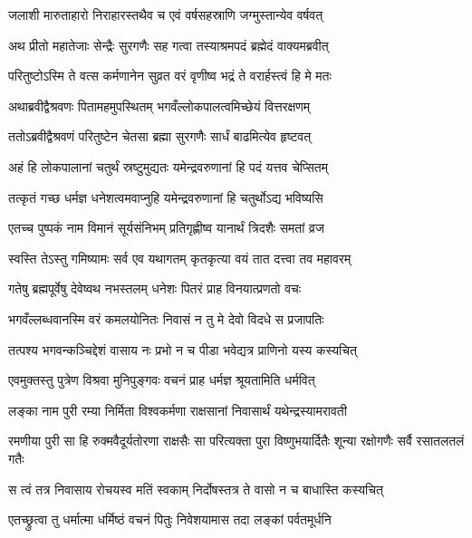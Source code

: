 \twolineshloka
{जलाशी मारुताहारो निराहारस्तथैव च}
{एवं वर्षसहस्राणि जग्मुस्तान्येव वर्षवत्} %

\twolineshloka
{अथ प्रीतो महातेजाः सेन्द्रैः सुरगणैः सह}
{गत्वा तस्याश्रमपदं ब्रह्मेदं वाक्यमब्रवीत्} %

\twolineshloka
{परितुष्टोऽस्मि ते वत्स कर्मणानेन सुव्रत}
{वरं वृणीष्व भद्रं ते वरार्हस्त्वं हि मे मतः} %

\twolineshloka
{अथाब्रवीद्वैश्रवणः पितामहमुपस्थितम्}
{भगवँल्लोकपालत्वमिच्छेयं वित्तरक्षणम्} %

\twolineshloka
{ततोऽब्रवीद्वैश्रवणं परितुष्टेन चेतसा}
{ब्रह्मा सुरगणैः सार्धं बाढमित्येव हृष्टवत्} %

\twolineshloka
{अहं हि लोकपालानां चतुर्थं स्रष्टुमुद्यतः}
{यमेन्द्रवरुणानां हि पदं यत्तव चेप्सितम्} %

\twolineshloka
{तत्कृतं गच्छ धर्मज्ञ धनेशत्वमवाप्नुहि}
{यमेन्द्रवरुणानां हि चतुर्थोऽद्य भविष्यसि} %

\twolineshloka
{एतच्च पुष्पकं नाम विमानं सूर्यसंनिभम्}
{प्रतिगृह्णीष्व यानार्थं त्रिदशैः समतां व्रज} %

\twolineshloka
{स्वस्ति तेऽस्तु गमिष्यामः सर्व एव यथागतम्}
{कृतकृत्या वयं तात दत्त्वा तव महावरम्} %

\twolineshloka
{गतेषु ब्रह्मपूर्वेषु देवेष्वथ नभस्तलम्}
{धनेशः पितरं प्राह विनयात्प्रणतो वचः} %

\twolineshloka
{भगवँल्लब्धवानस्मि वरं कमलयोनितः}
{निवासं न तु मे देवो विदधे स प्रजापतिः} %

\twolineshloka
{तत्पश्य भगवन्कञ्चिद्देशं वासाय नः प्रभो}
{न च पीडा भवेद्यत्र प्राणिनो यस्य कस्यचित्} %

\twolineshloka
{एवमुक्तस्तु पुत्रेण विश्रवा मुनिपुङ्गवः}
{वचनं प्राह धर्मज्ञ श्रूयतामिति धर्मवित्} %

\twolineshloka
{लङ्का नाम पुरी रम्या निर्मिता विश्वकर्मणा}
{राक्षसानां निवासार्थं यथेन्द्रस्यामरावती} %

\threelineshloka
{रमणीया पुरी सा हि रुक्मवैदूर्यतोरणा}
{राक्षसैः सा परित्यक्ता पुरा विष्णुभयार्दितैः}
{शून्या रक्षोगणैः सर्वै रसातलतलं गतैः} %

\twolineshloka
{स त्वं तत्र निवासाय रोचयस्व मतिं स्वकाम्}
{निर्दोषस्तत्र ते वासो न च बाधास्ति कस्यचित्} %

\twolineshloka
{एतच्छ्रुत्वा तु धर्मात्मा धर्मिष्ठं वचनं पितुः}
{निवेशयामास तदा लङ्कां पर्वतमूर्धनि} %

